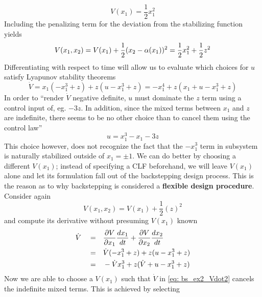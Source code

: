 \documentclass[12pt]{ucthesis}
\begin{document}
\begin{eg}
		\begin{equation} \label{eq: bs_ex2_V}
			V(x_1) = \frac{1}{2}x_1^2
		\end{equation}
	Including the penalizing term for the deviation from the stabilizing function yields
		\begin{equation} \label{eq: bs_ex2_V2}
			V(x_1,x_2) = V(x_1) + \frac{1}{2}(x_2 - \alpha(x_1))^2 = \frac{1}{2}x_1^2 + \frac{1}{2}z^2
		\end{equation}
	Differentiating with respect to time will allow us to evaluate which choices for $u$ satisfy Lyapunov stability theorems
		\begin{equation} \label{eq: bs_ex2_Vdot}
			\dot{V} = x_1(-x_1^3+z) + z(u-x_1^3+z) = -x_1^4 + z(x_1+u-x_1^3+z)
		\end{equation}
	In order to ``render $\dot{V}$ negative definite, $u$ must dominate the $z$ term using a control input of, eg. $-3z$. In addition, since the mixed terms between $x_1$ and $z$ are indefinite, there seems to be no other choice than to cancel them using the control law''
		\begin{equation} \label{eq: bs_ex2_u}
			u = x_1^3 - x_1 -3z
		\end{equation}	
	\indent This choice however, does not recognize the fact that the $-x_1^3$ term in subsystem is naturally stabilized outside of $x_1=\pm1$. We can do better by choosing a different $V(x_1)$; instead of specifying a CLF beforehand, we will leave $V(x_1)$ alone and let its formulation fall out of the backstepping design process. This is the reason as to why backstepping is considered a \textbf{flexible design procedure}. Consider  again 
		\begin{equation} \label{eq: bs_ex2_V3}
			V(x_1,x_2) = V(x_1) + \frac{1}{2}(z)^2
		\end{equation}	
	and compute its derivative without presuming $V(x_1)$ known
		\begin{equation} \label{eq: bs_ex2_Vdot2}
			\begin{aligned}
				\dot{V} 	\quad=&\quad \frac{\partial V}{\partial x_1}\frac{d x_1}{d t} + \frac{\partial V}{\partial x_2}\frac{d x_2}{d t}\\
							\quad=&\quad \dot{V}(-x_1^3+z) + z(u - x_1^3 + z) \\
							\quad=&\quad -\dot{V}x_1^3 + z(\dot{V} + u - x_1^3 + z)
			\end{aligned}
		\end{equation}
	\indent Now we are able to choose a $V(x_1)$ such that $\dot{V}$ in \ref{eq: bs_ex2_Vdot2} cancels the indefinite mixed terms. This is achieved by selecting

\end{eg}
\end{document}
